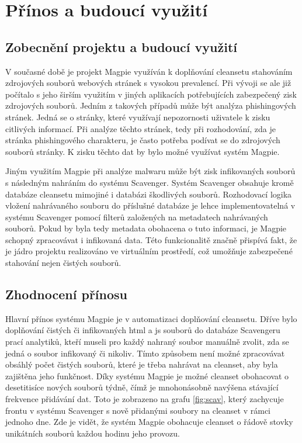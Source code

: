 \documentclass[thesis=M,czech,hidelinks]{FITthesis}[2013/05/06]
\begin{document}
\chapter{Přínos a budoucí využití}
\section{Zobecnění projektu a budoucí využití}
V současné době je projekt Magpie využíván k doplňování cleansetu stahováním zdrojových souborů webových stránek s vysokou prevalencí. Při vývoji se ale již počítalo s jeho širším využitím v jiných aplikacích potřebujících zabezpečený zisk zdrojových souborů. Jedním z takových případů může být analýza phishingových stránek. Jedná se o stránky, které využívají nepozornosti uživatele k zisku citlivých informací. Při analýze těchto stránek, tedy při rozhodování, zda je stránka phishingového charakteru, je často potřeba podívat se do zdrojových souborů stránky. K zisku těchto dat by bylo možné využívat systém Magpie. 

Jiným využitím Magpie při analýze malwaru může být zisk infikovaných souborů s následným nahráním do systému Scavenger. Systém Scavenger obsahuje kromě databáze cleansetu mimojiné i databázi škodlivých souborů. Rozhodovací logika vložení nahrávaného souboru do příslušné databáze je lehce implementovatelná v systému Scavenger pomocí filterů založených na metadatech nahrávaných souborů. Pokud by byla tedy metadata obohacena o tuto informaci, je Magpie schopný zpracovávat i infikovaná data. Této funkcionalitě značně přispívá fakt, že je jádro projektu realizováno ve virtuálním prostředí, což umožňuje zabezpečené stahování nejen čistých souborů.



\section{Zhodnocení přínosu}
Hlavní přínos systému Magpie je v automatizaci doplňování cleansetu. Dříve bylo doplňování čistých či infikovaných html a js souborů do databáze Scavengeru prací analytiků, kteří museli pro každý nahraný soubor manuálně zvolit, zda se jedná o soubor infikovaný či nikoliv. Tímto způsobem není možné zpracovávat obsáhlý počet čistých souborů, které je třeba nahrávat na cleanset, aby byla zajištěna jeho funkčnost. Díky systému Magpie je možné cleanset obohacovat o desetitisíce nových souborů týdně, čímž je mnohonásobně navýšena stávající frekvence přidávání dat. Toto je zobrazeno na grafu \ref{fig:scav}, který zachycuje frontu v systému Scavenger s nově přidanými soubory na cleanset v rámci jednoho dne. Zde je vidět, že systém Magpie obohacuje cleanset o řádově stovky unikátních souborů každou hodinu jeho provozu. 
\end{document}
